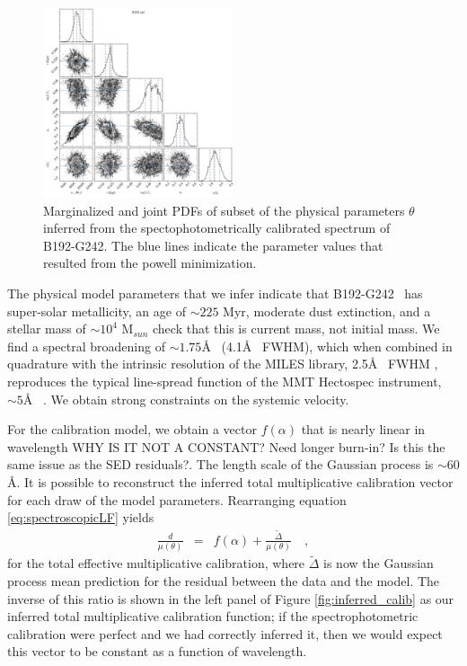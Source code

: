 \documentclass[iop,numberedappendix]{emulateapj}
\newcommand{\excluster}{B192-G242}
\begin{document}
\begin{figure}[h!]
\includegraphics[width=0.5\textwidth]{figures/ptri_b192-g242_020_cal.png}
\caption{ Marginalized and joint PDFs of  subset of the physical
  parameters $\theta$ inferred from the spectophotometrically
  calibrated spectrum of \excluster. The blue lines indicate the
  parameter values that resulted from the powell minimization. \label{fig:inferred_params}}
\end{figure}

The physical model parameters that we infer indicate that \excluster~
has super-solar metallicity, an age of $\sim 225$ Myr, moderate dust
extinction, and a stellar mass of $\sim 10^{4}$ M$_{sun}$ {\color{blue}
check that this is current mass, not initial mass}.  We find a spectral
broadening of $\sim 1.75$\AA~ (4.1\AA~ FWHM), which when combined in
quadrature with the intrinsic resolution of the MILES library, 2.5\AA~
FWHM \citep{beifiori11}, reproduces the typical line-spread function
of the MMT Hectospec instrument, $\sim 5$\AA~ \citep{fabricant13}.
We obtain strong constraints on the systemic velocity.

For the calibration model, we obtain a vector $f(\alpha)$
that is nearly linear in wavelength {\color{red} WHY IS IT NOT A
CONSTANT?  Need longer burn-in?  Is this the same issue as the SED
residuals?}.  The length scale of the Gaussian process is $\sim
60$\AA.  It is possible to reconstruct the inferred total
multiplicative calibration vector for each draw of the model
parameters.  Rearranging equation \ref{eq:spectroscopicLF} yields
\begin{eqnarray} 
\frac{d}{\mu(\theta)} & = & f(\alpha) +
\frac{\tilde{\Delta}}{\mu(\theta)}
\quad ,
\end{eqnarray}
for the total effective multiplicative calibration, where
$\tilde{\Delta}$ is now the Gaussian process mean prediction for the
residual between the data and the model. The inverse of this ratio is
shown in the left panel of Figure \ref{fig:inferred_calib} as our
inferred total multiplicative calibration function; if the
spectrophotometric calibration were perfect and we had correctly
inferred it, then we would expect this vector to be constant as a
function of wavelength.
\end{document}
